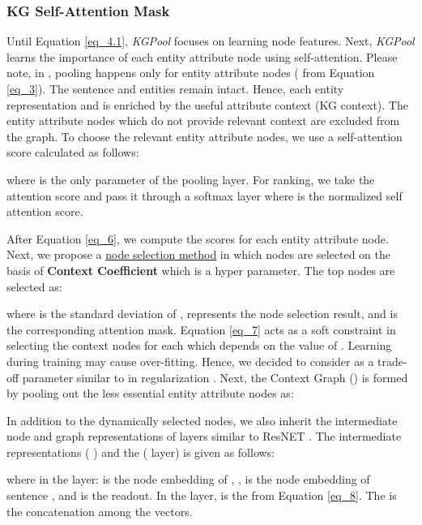 \documentclass[11pt,a4paper]{article}
\begin{document}
\subsubsection{KG Self-Attention Mask} \label{sec:self_attention}
Until Equation \ref{eq_4.1}, \textit{KGPool} focuses on learning node features. Next, \textit{KGPool} learns the importance of each entity attribute node using self-attention. Please note, in , pooling happens only for entity attribute nodes ( from Equation \ref{eq_3}). The sentence  and entities  remain intact. Hence, each entity representation  and  is enriched by the useful attribute context (KG context). The entity attribute nodes which do not provide relevant context are excluded from the graph.
To choose the relevant entity attribute nodes, we use a self-attention score  \cite{lee2019self} calculated as follows:
 

where  is the only parameter of the pooling layer.
For ranking, we take the attention score and pass it through a softmax layer where   is the normalized self attention score.
 
After Equation \ref{eq_6}, we compute the scores for each entity attribute node. Next, we propose a \underline{node selection method} in which nodes are selected on the basis of \textbf{Context Coefficient}  which is a hyper parameter. The top nodes are selected as:
 
where  is the standard deviation of ,  represents the node selection result, and  is the corresponding attention mask. Equation \ref{eq_7} acts as a soft constraint in selecting the context nodes for each  which depends on the value of . Learning  during training may cause over-fitting. Hence, we decided to consider  as a trade-off parameter similar to  in regularization \cite{buhlmann2011statistics}.
Next, the Context Graph () is formed by pooling out the less essential entity attribute nodes as: 

In addition to the dynamically selected nodes, we also inherit the intermediate node and graph representations of  layers similar to ResNET \cite{he2016deep}. The intermediate representations ( ) and the  ( layer) is given as follows: 

where in the  layer:  is the node embedding of , ,  is the node embedding of sentence , and  is the readout. In the  layer,  is the   from Equation \ref{eq_8}. The  is the concatenation among the vectors. 
\end{document}
